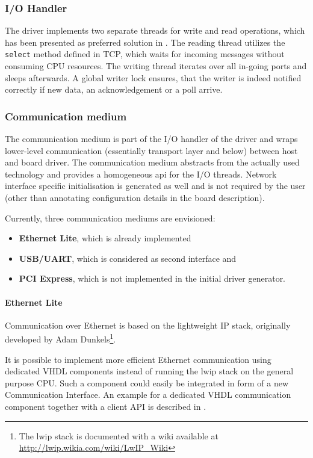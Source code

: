 \documentclass{report}
\begin{document}
\subsubsection{I/O Handler}
The driver implements two separate threads for write and read operations, which has been presented as preferred solution in .
The reading thread utilizes the \texttt{select} method defined in TCP, which waits for incoming messages without consuming CPU resources. The writing thread iterates over all in-going ports and sleeps afterwards. A global writer lock ensures, that the writer is indeed notified correctly if new data, an acknowledgement or a poll arrive.

\subsubsection{Communication medium}
The communication medium is part of the I/O handler of the driver and wraps lower-level communication (essentially transport layer and below) between host and board driver. The communication medium abstracts from the actually used technology and provides a homogeneous api for the I/O threads. Network interface specific initialisation is generated as well and is not required by the user (other than annotating configuration details in the board description).

Currently, three communication mediums are envisioned:
\begin{itemize} \itemsep1pt \parskip0pt 
\item \textbf{Ethernet Lite}, which is already implemented
\item \textbf{USB/UART}, which is considered as second interface and
\item \textbf{PCI Express}, which is not implemented in the initial driver generator.
\end{itemize}

\paragraph{Ethernet Lite}
Communication over Ethernet is based on the lightweight IP stack, originally developed by Adam Dunkels\footnote{The lwip stack is documented with a wiki available at \url{http://lwip.wikia.com/wiki/LwIP_Wiki}}.

It is possible to implement more efficient Ethernet communication using dedicated VHDL components instead of running the lwip stack on the general purpose CPU. Such a component could easily be integrated in form of a new Communication Interface. An example for a dedicated VHDL communication component together with a client API is described in \cite{alachiotis10, alachiotis12}.
\end{document}
